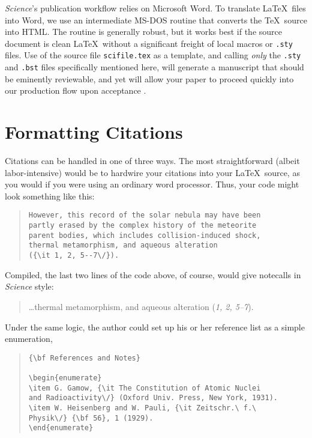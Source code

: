\documentclass[12pt]{article}
\begin{document}
{\it Science\/}'s publication workflow relies on Microsoft Word.  To
translate \LaTeX\ files into Word, we use an intermediate MS-DOS
routine \cite{tth} that converts the \TeX\ source into HTML\@.  The
routine is generally robust, but it works best if the source document
is clean \LaTeX\ without a significant freight of local macros or
\texttt{.sty} files.  Use of the source file \texttt{scifile.tex} as a
template, and calling {\it only\/} the \texttt{.sty} and \texttt{.bst}
files specifically mentioned here, will generate a manuscript that
should be eminently reviewable, and yet will allow your paper to
proceed quickly into our production flow upon acceptance \cite{use2e}.


\section*{Formatting Citations}

Citations can be handled in one of three ways.  The most
straightforward (albeit labor-intensive) would be to hardwire your
citations into your \LaTeX\ source, as you would if you were using an
ordinary word processor.  Thus, your code might look something like
this:


\begin{quote}
\begin{verbatim}
However, this record of the solar nebula may have been
partly erased by the complex history of the meteorite
parent bodies, which includes collision-induced shock,
thermal metamorphism, and aqueous alteration
({\it 1, 2, 5--7\/}).
\end{verbatim}
\end{quote}


\noindent Compiled, the last two lines of the code above, of course, would give notecalls in {\it Science\/} style:

\begin{quote}
\ldots thermal metamorphism, and aqueous alteration ({\it 1, 2, 5--7\/}).
\end{quote}

Under the same logic, the author could set up his or her reference list as a simple enumeration,

\begin{quote}
\begin{verbatim}
{\bf References and Notes}

\begin{enumerate}
\item G. Gamow, {\it The Constitution of Atomic Nuclei
and Radioactivity\/} (Oxford Univ. Press, New York, 1931).
\item W. Heisenberg and W. Pauli, {\it Zeitschr.\ f.\ 
Physik\/} {\bf 56}, 1 (1929).
\end{enumerate}
\end{verbatim}
\end{quote}
\end{document}
